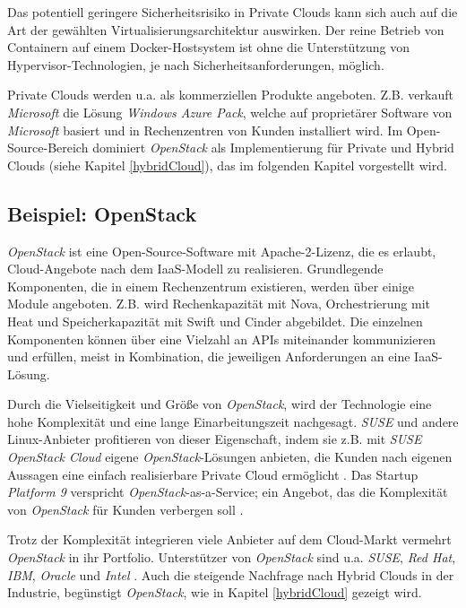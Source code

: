 \documentclass[../main.tex]{subfiles}
\begin{document}
    Das potentiell geringere Sicherheitsrisiko in Private Clouds kann sich auch auf die Art der gewählten Virtualisierungsarchitektur auswirken. Der reine Betrieb von Containern auf einem Docker-Hostsystem ist ohne die Unterstützung von Hypervisor-Technologien, je nach Sicherheitsanforderungen, möglich.

    Private Clouds werden u.a. als kommerziellen Produkte angeboten. Z.B. verkauft \emph{Microsoft} die Lösung \emph{Windows Azure Pack}, welche auf proprietärer Software von \emph{Microsoft} basiert und in Rechenzentren von Kunden installiert wird. Im Open-Source-Bereich dominiert \emph{OpenStack} als Implementierung für Private und Hybrid Clouds (siehe Kapitel \ref{hybridCloud}), das im folgenden Kapitel vorgestellt wird.

    \subsection{Beispiel: OpenStack}
      \emph{OpenStack} ist eine Open-Source-Software mit Apache-2-Lizenz, die es erlaubt, Cloud-Angebote nach dem IaaS-Modell zu realisieren. Grundlegende Komponenten, die in einem Rechenzentrum existieren, werden über einige Module angeboten. Z.B. wird Rechenkapazität mit Nova, Orchestrierung mit Heat und Speicherkapazität mit Swift und Cinder abgebildet. Die einzelnen Komponenten können über eine Vielzahl an APIs miteinander kommunizieren und erfüllen, meist in Kombination, die jeweiligen Anforderungen an eine IaaS-Lösung.

      Durch die Vielseitigkeit und Größe von \emph{OpenStack}, wird der Technologie eine hohe Komplexität und eine lange Einarbeitungszeit nachgesagt. \emph{SUSE} und andere Linux-Anbieter profitieren von dieser Eigenschaft, indem sie z.B. mit \emph{SUSE OpenStack Cloud} eigene \emph{OpenStack}-Lösungen anbieten, die Kunden nach eigenen Aussagen eine einfach realisierbare Private Cloud ermöglicht \cite{SusePrivateCloud}\cite[S.2+4]{golemOpenStack}.
      Das Startup \emph{Platform 9} verspricht \emph{OpenStack}-as-a-Service; ein Angebot, das die Komplexität von \emph{OpenStack} für Kunden verbergen soll \cite{platform9}.

      Trotz der Komplexität integrieren viele Anbieter auf dem Cloud-Markt vermehrt \emph{OpenStack} in ihr Portfolio. Unterstützer von \emph{OpenStack} sind u.a. \emph{SUSE}, \emph{Red Hat}, \emph{IBM}, \emph{Oracle} und \emph{Intel} \cite{heiseOpenStack}\cite{IBMDockerOpenStack}. Auch die steigende Nachfrage nach Hybrid Clouds in der Industrie, begünstigt \emph{OpenStack}, wie in Kapitel \ref{hybridCloud} gezeigt wird.
\end{document}
